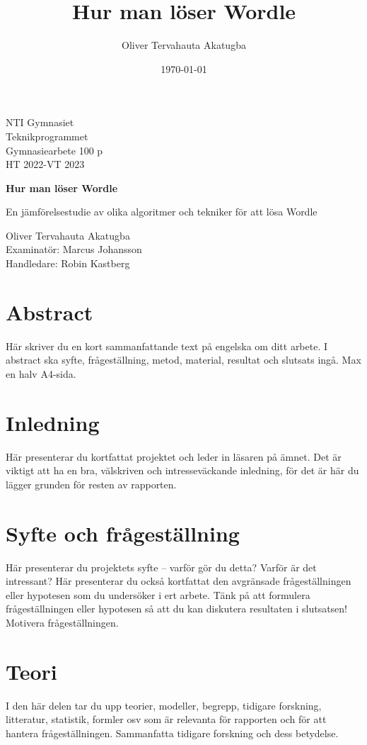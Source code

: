 \documentclass{article}
\title{Hur man löser Wordle}
\author{Oliver Tervahauta Akatugba}
\date{\today}
\begin{document}
\begin{titlepage}
\noindent
NTI Gymnasiet \\
Teknikprogrammet \\
Gymnasiearbete 100 p \\
HT 2022-VT 2023
\begin{center}
\vspace*{1.5cm}
\Huge
\textbf{Hur man löser Wordle}
\vspace{0.5cm}

\large
En jämförelsestudie av olika algoritmer och tekniker för att lösa Wordle
\end{center}

\vfill
\normalsize
\noindent
Oliver Tervahauta Akatugba\\
Examinatör: Marcus Johansson\\
Handledare: Robin Kastberg
\end{titlepage}

\section*{Abstract}
Här skriver du en kort sammanfattande text på engelska om ditt arbete. I abstract ska syfte, frågeställning, metod, material, resultat och slutsats ingå. Max en halv A4-sida. 
\clearpage

\tableofcontents
\clearpage

\section{Inledning}
Här presenterar du kortfattat projektet och leder in läsaren på ämnet. Det är viktigt att ha en bra, välskriven och intresseväckande inledning, för det är här du lägger grunden för resten av rapporten.

\section{Syfte och frågeställning}
Här presenterar du projektets syfte – varför gör du detta? Varför är det intressant? Här presenterar du också kortfattat den avgränsade frågeställningen eller hypotesen som du undersöker i ert arbete. Tänk på att formulera frågeställningen eller hypotesen så att du kan diskutera resultaten i slutsatsen! Motivera frågeställningen.

\section{Teori}
I den här delen tar du upp teorier, modeller, begrepp, tidigare forskning, litteratur, statistik, formler osv som är relevanta för rapporten och för att hantera frågeställningen. Sammanfatta tidigare forskning och dess betydelse. 
\end{document}
